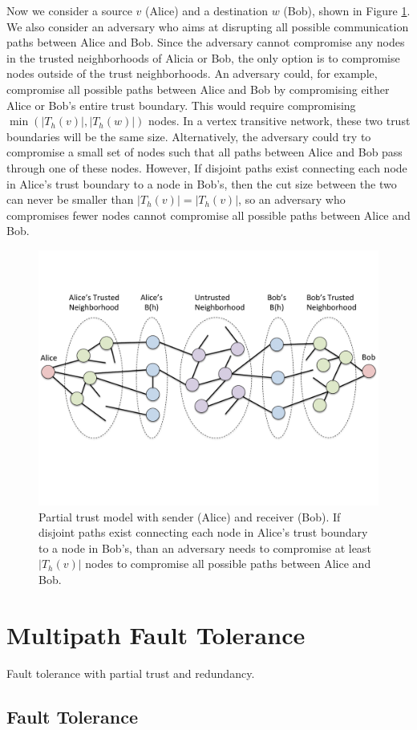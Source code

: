 \documentclass[prodmode,permissions]{acmsmall-ec16}
\begin{document}
Now we consider a source $v$ (Alice) and a destination $w$ (Bob),
shown in Figure \ref{fig:trust-source-destionation}. We also consider an adversary who aims at disrupting all possible communication paths between Alice and Bob. Since the adversary cannot compromise any nodes in the trusted neighborhoods of Alicia or Bob, the only option is to compromise nodes outside of the trust neighborhoods. An adversary could, for example, compromise all possible paths between Alice and Bob by compromising either Alice or Bob's entire trust boundary. This would require compromising $\min(|T_h(v)|, |T_h(w)|)$ nodes. In a vertex transitive network, these two trust boundaries will be the same size. Alternatively, the adversary could try to compromise a small set of nodes such that all paths between Alice and Bob pass through one of these nodes. However, If disjoint paths exist connecting each node in Alice's trust boundary to
a node in Bob's, then the cut size between the two can never be smaller than
$|T_h(v)| = |T_h(v)|$, so an adversary who compromises fewer nodes cannot compromise all possible paths between Alice and Bob.

\begin{figure}
\centerline{\includegraphics[height =.4 \textwidth]{fig-bob_Alice_trusted_neigh2}}
\caption{
Partial trust model with sender (Alice) and receiver (Bob).
If disjoint paths exist connecting each node in Alice's trust boundary to
a node in Bob's,
than an adversary needs to compromise at least $|T_h(v)|$ nodes to
compromise all possible paths between Alice and Bob.
}
\label{fig:trust-source-destionation}
\end{figure}

\section{Multipath Fault Tolerance}

Fault tolerance with partial trust and redundancy.

\subsection{Fault Tolerance}
\end{document}

